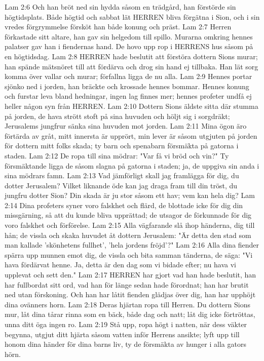 Lam 2:6  Och han bröt ned sin hydda såsom en trädgård, han förstörde sin högtidsplats. Både högtid och sabbat lät HERREN bliva förgätna i Sion, och i sin vredes förgrymmelse försköt han både konung och präst.
Lam 2:7  Herren förkastade sitt altare, han gav sin helgedom till spillo. Murarna omkring hennes palatser gav han i fiendernas hand. De hovo upp rop i HERRENS hus såsom på en högtidsdag.
Lam 2:8  HERREN hade beslutit att förstöra dottern Sions murar; han spände mätsnöret till att fördärva och drog sin hand ej tillbaka. Han lät sorg komma över vallar och murar; förfallna ligga de nu alla.
Lam 2:9  Hennes portar sjönko ned i jorden, han bräckte och krossade hennes bommar. Hennes konung och furstar leva bland hedningar, ingen lag finnes mer; hennes profeter undfå ej heller någon syn från HERREN.
Lam 2:10  Dottern Sions äldste sitta där stumma på jorden, de hava strött stoft på sina huvuden och höljt sig i sorgdräkt; Jerusalems jungfrur sänka sina huvuden mot jorden.
Lam 2:11  Mina ögon äro förtärda av gråt, mitt innersta är upprört, min lever är såsom utgjuten på jorden för dottern mitt folks skada; ty barn och spenabarn försmäkta på gatorna i staden.
Lam 2:12  De ropa till sina mödrar: "Var få vi bröd och vin?" Ty försmäktande ligga de såsom slagna på gatorna i staden; ja, de uppgiva sin anda i sina mödrars famn.
Lam 2:13  Vad jämförligt skall jag framlägga för dig, du dotter Jerusalem? Vilket liknande öde kan jag draga fram till din tröst, du jungfru dotter Sion? Din skada är ju stor såsom ett hav; vem kan hela dig?
Lam 2:14  Dina profeters syner voro falskhet och flärd, de blottade icke för dig din missgärning, så att du kunde bliva upprättad; de utsagor de förkunnade för dig voro falskhet och förförelse.
Lam 2:15  Alla vägfarande slå ihop händerna, dig till hån; de vissla och skaka huvudet åt dottern Jerusalem: "Är detta den stad som man kallade 'skönhetens fullhet', 'hela jordens fröjd'?"
Lam 2:16  Alla dina fiender spärra upp munnen emot dig, de vissla och bita samman tänderna, de säga: "Vi hava fördärvat henne. Ja, detta är den dag som vi bidade efter; nu hava vi upplevat och sett den."
Lam 2:17  HERREN har gjort vad han hade beslutit, han har fullbordat sitt ord, vad han för länge sedan hade förordnat; han har brutit ned utan förskoning. Och han har låtit fienden glädjas över dig, han har upphöjt dina ovänners horn.
Lam 2:18  Deras hjärtan ropa till Herren. Du dottern Sions mur, låt dina tårar rinna som en bäck, både dag och natt; låt dig icke förtröttas, unna ditt öga ingen ro.
Lam 2:19  Stå upp, ropa högt i natten, när dess väkter begynna, utgjut ditt hjärta såsom vatten inför Herrens ansikte; lyft upp till honom dina händer för dina barns liv, ty de försmäkta av hunger i alla gators hörn.

